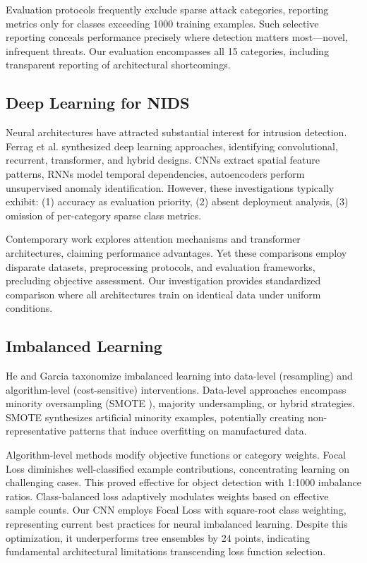 \documentclass[10pt,twocolumn]{article}
\begin{document}
Evaluation protocols frequently exclude sparse attack categories, reporting metrics only for classes exceeding 1000 training examples. Such selective reporting conceals performance precisely where detection matters most—novel, infrequent threats. Our evaluation encompasses all 15 categories, including transparent reporting of architectural shortcomings.

\subsection{Deep Learning for NIDS}

Neural architectures have attracted substantial interest for intrusion detection. Ferrag et al. \cite{ferrag2020deep} synthesized deep learning approaches, identifying convolutional, recurrent, transformer, and hybrid designs. CNNs extract spatial feature patterns, RNNs model temporal dependencies, autoencoders perform unsupervised anomaly identification. However, these investigations typically exhibit: (1) accuracy as evaluation priority, (2) absent deployment analysis, (3) omission of per-category sparse class metrics.

Contemporary work explores attention mechanisms and transformer architectures, claiming performance advantages. Yet these comparisons employ disparate datasets, preprocessing protocols, and evaluation frameworks, precluding objective assessment. Our investigation provides standardized comparison where all architectures train on identical data under uniform conditions.

\subsection{Imbalanced Learning}

He and Garcia \cite{he2009imbalanced} taxonomize imbalanced learning into data-level (resampling) and algorithm-level (cost-sensitive) interventions. Data-level approaches encompass minority oversampling (SMOTE \cite{chawla2002smote}), majority undersampling, or hybrid strategies. SMOTE synthesizes artificial minority examples, potentially creating non-representative patterns that induce overfitting on manufactured data.

Algorithm-level methods modify objective functions or category weights. Focal Loss \cite{lin2017focal} diminishes well-classified example contributions, concentrating learning on challenging cases. This proved effective for object detection with 1:1000 imbalance ratios. Class-balanced loss adaptively modulates weights based on effective sample counts. Our CNN employs Focal Loss with square-root class weighting, representing current best practices for neural imbalanced learning. Despite this optimization, it underperforms tree ensembles by 24 points, indicating fundamental architectural limitations transcending loss function selection.
\end{document}
